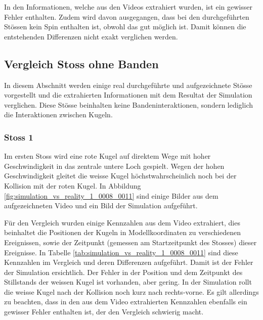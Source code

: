 In den Informationen, welche aus den Videos extrahiert wurden, ist ein gewisser Fehler enthalten.
Zudem wird davon ausgegangen, dass bei den durchgeführten Stössen kein Spin enthalten ist, obwohl das gut möglich ist.
Damit können die entstehenden Differenzen nicht exakt verglichen werden.

\newpage
\subsection{Vergleich Stoss ohne Banden}
In diesem Abschnitt werden einige real durchgeführte und aufgezeichnete Stösse vorgestellt und die extrahierten Informationen mit
dem Resultat der Simulation verglichen.
Diese Stösse beinhalten keine Bandeninteraktionen, sondern lediglich die Interaktionen zwischen Kugeln.

\subsubsection{Stoss 1}
Im ersten Stoss wird eine rote Kugel auf direktem Wege mit hoher Geschwindigkeit in das zentrale untere Loch gespielt.
Wegen der hohen Geschwindigkeit gleitet die weisse Kugel höchstwahrscheinlich noch bei der Kollision mit der roten Kugel.
In Abbildung \ref{fig:simulation_vs_reality_1_0008_0011} sind einige Bilder aus dem aufgezeichneten Video und ein Bild
der Simulation aufgeführt.

Für den Vergleich wurden einige Kennzahlen aus dem Video extrahiert, dies beinhaltet die Positionen der Kugeln
in Modellkoordinaten zu verschiedenen Ereignissen, sowie der Zeitpunkt (gemessen am Startzeitpunkt des Stosses) dieser Ereignisse.
In Tabelle \ref{tab:simulation_vs_reality_1_0008_0011} sind diese Kennzahlen im Vergleich und deren Differenzen aufgeführt.
Damit ist der Fehler der Simulation ersichtlich.
Der Fehler in der Position und dem Zeitpunkt des Stillstands der weissen Kugel ist vorhanden, aber gering.
In der Simulation rollt die weisse Kugel nach der Kollision noch kurz nach rechts-vorne.
Es gilt allerdings zu beachten, dass in den aus dem Video extrahierten Kennzahlen ebenfalls ein
gewisser Fehler enthalten ist, der den Vergleich schwierig macht.

